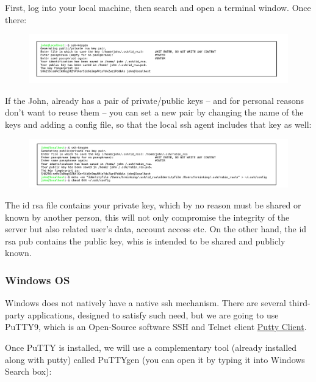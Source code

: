 First, log into your local machine, then search and open a terminal window. Once there:

\begin{figure}
  \includegraphics[width=16cm]{Images/example6.png}
\end{figure}

If the John, already has a pair of private/public keys – and for personal reasons don’t want to reuse them –
you can set a new pair by changing the name of the keys and adding a config file, so that the local ssh agent
includes that key as well:

\begin{figure}
  \includegraphics[width=16cm]{Images/example7.png}
\end{figure}

The id rsa file contains your private key, which by no reason must be shared or known by another person, this will not only compromise the integrity of the server but also related user's data, account access etc. On the other hand, the id rsa pub contains the public key, whis is intended to be shared and publicly known.

\newpage
\subsubsection{Windows OS}
\label{sec:SSH}

Windows does not natively have a native ssh mechanism. There are several third-party applications,
designed to satisfy such need, but we are going to use PuTTY9, which is an Open-Source software SSH and
Telnet client \href{https://the.earth.li/~sgtatham/putty/latest/w64/putty-64bit-0.74-installer.msi}{Putty Client}.


Once PuTTY is installed, we will use a complementary tool (already installed along with putty) called
PuTTYgen (you can open it by typing it into Windows Search box):

\vspace{5 mm}

